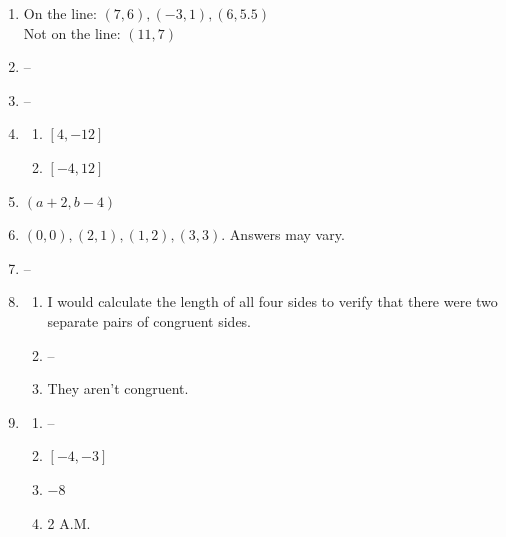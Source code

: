 \documentclass{article}
\begin{document}
\begin{enumerate}
\begin{enumerate}
	\item Image of B: $(-1, 0)$ \\
		Image of C: $(2, 6)$
	
	\end{enumerate}
	
\item On the line: $(7, 6), (-3, 1), (6, 5.5)$ \\
	Not on the line: $(11, 7)$
	
\item --

\item --

\item \begin{enumerate} 

	\item $[4, - 12]$

	\item $[-4, 12]$
	
	\end{enumerate}

\item $(a + 2, b - 4)$

\item $(0,0), (2, 1), (1,2), (3,3)$. Answers may vary.

\item --

\item 
	\begin{enumerate}
	
	\item I would calculate the length of all four sides to verify that there were two separate pairs of congruent sides.
	
	\item --
	
	\item They aren't congruent.
	
	\end{enumerate}
	
\item
	\begin{enumerate}
	
	\item --
	
	\item $[-4, -3]$
	
	\item $-8$
	
	\item 2 A.M.
	

\end{enumerate}
\end{enumerate}
\end{document}
